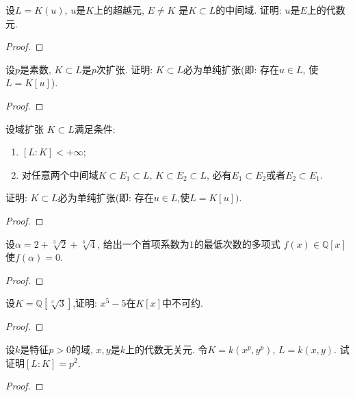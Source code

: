 \begin{problem}
    设$L = K(u)$, $u$是$K$上的超越元, $E \neq K$
是$K\subset L$的中间域. 证明: $u$是$E$上的代数元.
\end{problem}

\begin{proof}
    
\end{proof}

\begin{problem}
    设$p$是素数, $K \subset L$是$p$次扩张. 证明: 
$K \subset L$必为单纯扩张(即: 存在$u \in L$, 使$L = K[u]$).
\end{problem}

\begin{proof}
    
\end{proof}

\begin{problem}
    设域扩张 $K \subset L$满足条件: 
\begin{enumerate}[(1)]
    \item $[L:K] < +\infty$;
    \item 对任意两个中间域$K \subset E_1 \subset L,\, K \subset E_2 \subset L$,
必有$E_1 \subset E_2$或者$E_2 \subset E_1$.
\end{enumerate}
证明: $K \subset L$必为单纯扩张(即: 存在$u \in L$,使$L = K[u])$.
\end{problem}

\begin{proof}
    
\end{proof}

\begin{problem}
    设$\alpha = 2 + \sqrt[3]{2} + \sqrt[3]{4}$,
给出一个首项系数为$1$的最低次数的多项式
$f(x) \in \mathbb{Q}[x]$使$f(\alpha) = 0$.
\end{problem}

\begin{proof}
    
\end{proof}

\begin{problem}
    设$K = \mathbb{Q}[\sqrt[3]{3}]$,证明: $x^5 - 5$在$K[x]$中不可约.
\end{problem}

\begin{proof}
    
\end{proof}

\begin{problem}
    设$k$是特征$p > 0$的域, $x, y$是$k$上的代数无关元.
令$K = k(x^{p}, y^{p})$, $L = k(x, y)$. 
试证明$[L:K] = p^{2}$.
\end{problem}

\begin{proof}
    
\end{proof}